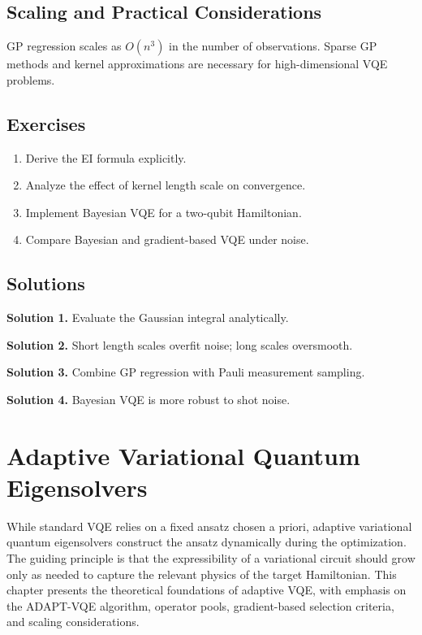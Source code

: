 \documentclass{book}
\begin{document}
\section{Scaling and Practical Considerations}

GP regression scales as $O(n^3)$ in the number of observations. Sparse GP methods and kernel approximations are necessary for high-dimensional VQE problems.

\section{Exercises}

\begin{enumerate}
\item Derive the EI formula explicitly.
\item Analyze the effect of kernel length scale on convergence.
\item Implement Bayesian VQE for a two-qubit Hamiltonian.
\item Compare Bayesian and gradient-based VQE under noise.
\end{enumerate}

\section{Solutions}

\textbf{Solution 1.} Evaluate the Gaussian integral analytically.

\textbf{Solution 2.} Short length scales overfit noise; long scales oversmooth.

\textbf{Solution 3.} Combine GP regression with Pauli measurement sampling.

\textbf{Solution 4.} Bayesian VQE is more robust to shot noise.



\chapter{Adaptive Variational Quantum Eigensolvers}

While standard VQE relies on a fixed ansatz chosen a priori, adaptive variational quantum eigensolvers construct the ansatz dynamically during the optimization. The guiding principle is that the expressibility of a variational circuit should grow only as needed to capture the relevant physics of the target Hamiltonian. This chapter presents the theoretical foundations of adaptive VQE, with emphasis on the ADAPT-VQE algorithm, operator pools, gradient-based selection criteria, and scaling considerations.
\end{document}
